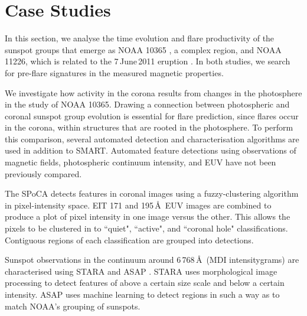 {                                                                                                                                                                                                                                                                                                                                                                                                                                                                                                     
\section{Case Studies}\label{sect:casestudies}

In this section, we analyse the time evolution and flare productivity of the sunspot groups that emerge as NOAA 10365 \citep{Verbeeck:2011}, a complex region, and NOAA 11226, which is related to the 7\,June\,2011 eruption \citep{Bloomfield:2012b}.  In both studies, we search for pre-flare signatures in the measured magnetic properties. 

We investigate how activity in the corona results from changes in the photosphere in the study of NOAA 10365. Drawing a connection between photospheric and coronal sunspot group evolution is essential for flare prediction, since flares occur in the corona, within structures that are rooted in the photosphere. To perform this comparison, several automated detection and characterisation algorithms are used in addition to \gls{SMART}. Automated feature detections using observations of magnetic fields, photospheric continuum intensity, and \gls{EUV} have not been previously compared.

The \gls{SPoCA} detects features in coronal images \citep{Barra:2009} using a fuzzy-clustering algorithm in pixel-intensity space. \gls{EIT} 171 and 195\,\AA\ \gls{EUV} images are combined to produce a plot of pixel intensity in one image versus the other. This allows the pixels to be clustered in to ``quiet", ``active", and ``coronal hole" classifications. Contiguous regions of each classification are grouped into detections. 

Sunspot observations in the continuum around 6\,768\,\AA\ (\gls{MDI} intensitygrams) are characterised using \gls{STARA} \citep{Watson:2009} and \gls{ASAP} \citep{Colak:2009}. \gls{STARA} uses morphological image processing to detect features of above a certain size scale and below a certain intensity. \gls{ASAP} uses machine learning to detect regions in such a way as to match NOAA's grouping of sunspots. 

}
